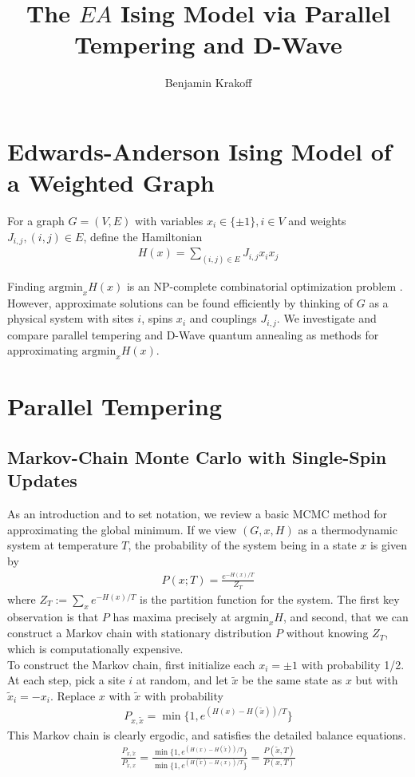 \documentclass[12pt]{article}
\newcommand{\1}{\mathbf{1}}
\theoremstyle{remark}
\theoremstyle{definition}
\theoremstyle{proposition}
\theoremstyle{lemma}
\theoremstyle{definition}
\begin{document}
	\title{The $EA$ Ising Model via Parallel Tempering and D-Wave}
	\author{Benjamin Krakoff}
	\maketitle
	
	\section{Edwards-Anderson Ising Model of a Weighted Graph}
	For a graph $G = (V, E)$ with variables $x_i \in \{\pm1\}, i \in V$ and weights $J_{i, j}, (i, j) \in E$, define the Hamiltonian
	\begin{align}
	H(x) = \sum_{(i, j) \in E} J_{i, j} x_ix_j
	\end{align}
	
	Finding $\text{argmin}_{x} H(x)$ is an NP-complete combinatorial optimization problem \cite{1982JPhA...15.3241B}. However, approximate solutions can be found efficiently by thinking of $G$ as a physical system with sites $i$, spins $x_i$ and couplings $J_{i, j}$. We investigate and compare parallel tempering and D-Wave quantum annealing as methods for approximating $\text{argmin}_{x} H(x)$.
	
	\section{Parallel Tempering}
	\subsection{Markov-Chain Monte Carlo with Single-Spin Updates}
	\indent \indent As an introduction and to set notation, we review a basic MCMC method for approximating the global minimum. If we view $(G, x, H)$ as a thermodynamic system at temperature $T$, the probability of the system being in a state $x$ is given by 
	\begin{align}
	P(x; T) = \frac{e^{-H(x)/T}}{Z_T}
	\end{align}
	where $Z_T := \sum_{x} e^{-H(x)/T}$ is the partition function for the system. The first key observation is that $P$ has maxima precisely at $\text{argmin}_x H$, and second, that we can construct a Markov chain with stationary distribution $P$ without knowing $Z_T$, which is computationally expensive. \\
	\indent To construct the Markov chain, first initialize each $x_i = \pm 1$ with probability 1/2. At each step, pick a site $i$ at random, and let $\tilde{x}$ be the same state as $x$ but with $\tilde{x}_i = -x_i$. Replace $x$ with $\tilde{x}$ with probability 
	\begin{align}
	P_{x, \tilde{x}} = \min\{1, e^{(H(x)- H(\tilde{x}))/T}\}
	\end{align}
	This Markov chain is clearly ergodic, and satisfies the detailed balance equations.
	\begin{align*}
		\frac{P_{x, \tilde{x}}}{P_{\tilde{x}, x}} = \frac{\min\{1, e^{(H(x)- H(\tilde{x}))/T}\}}{\min\{1, e^{(H(\tilde{x})- H(x))/T}\}} = \frac{P(\tilde{x}, T)}{P(x, T)}
		\end{align*}
	
\end{document}
